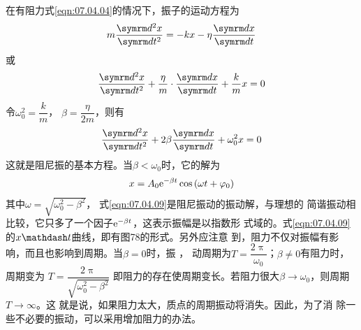 在有阻力\lhbrak 式\eqref{eqn:07.04.04}\rhbrak 的情况下，振子的运动方程为
\begin{equation*}
    m \frac { \dif ^ { 2 } x } { \dif t ^ { 2 } } = - k x - \eta \frac { \dif x } { \dif t }
\end{equation*}
或\vspace{-1.3em}
\begin{equation*}
    \frac { \dif ^ { 2 } x } { \dif t ^ { 2 } } + \frac { \eta } { m } \cdot \frac { \dif x } { \dif t } + \frac { k } { m } x = 0
\end{equation*}
令$ \omega _ 0 ^ { 2 } = \dfrac { k } { m }  $， $ \beta = \dfrac { \eta } { 2 m } $，则有
\begin{equation}\label{eqn:07.04.08}
    \frac { \dif ^ { 2 } x } { \dif t ^ { 2 } } + 2 \beta \frac { \dif x } { \dif t } + \omega _ { 0 } ^ { 2 } x = 0
\end{equation}
这就是阻尼振的基本方程。当$  \beta < \omega _ { 0 }   $时，它的解为
\begin{equation}\label{eqn:07.04.09}
    x = A _ { 0 } \mathrm e ^ { - \beta t } \cos \left( \omega t + \varphi _ { 0 } \right)
\end{equation}
其中$\omega = \sqrt { \omega _ 0 ^ { 2 } - \beta ^ { 2 } } $， 式\eqref{eqn:07.04.09}是阻尼振动的振动解，与理想的
简谐振动相比较，它只多了一个因子$ \mathrm e ^ { - \beta t } $，这表示振幅是以指数形
式域的。式\eqref{eqn:07.04.09}的$ x \mathdash t  $曲线，即有图78的形式。另外应注意
到，阻力不仅对振幅有影响，而且也影响到周期。当$  \beta = 0   $时，振
， \beta
动周期为$ T = \dfrac { 2 \uppi } { \omega _ { 0 } }  $；$  \beta \ne 0   $有阻力时，周期变为
$ T = \dfrac { 2 \uppi } { \sqrt { \omega _ { 0 } ^ { 2 } - \beta ^ { 2 } } } $
即阻力的存在使周期变长。若阻力很大$ \beta \to \omega _ { 0 } $，则周期$ T \to \infty $。这
就是说，如果阻力太大，质点的周期振动将消失。因此，为了消
除一些不必要的振动，可以采用增加阻力的办法。